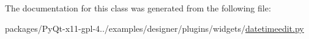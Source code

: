 The documentation for this class was generated from the following file\+:\begin{DoxyCompactItemize}
\item 
packages/\+Py\+Qt-\/x11-\/gpl-\/4../examples/designer/plugins/widgets/\hyperlink{datetimeedit_8py}{datetimeedit.\+py}\end{DoxyCompactItemize}
